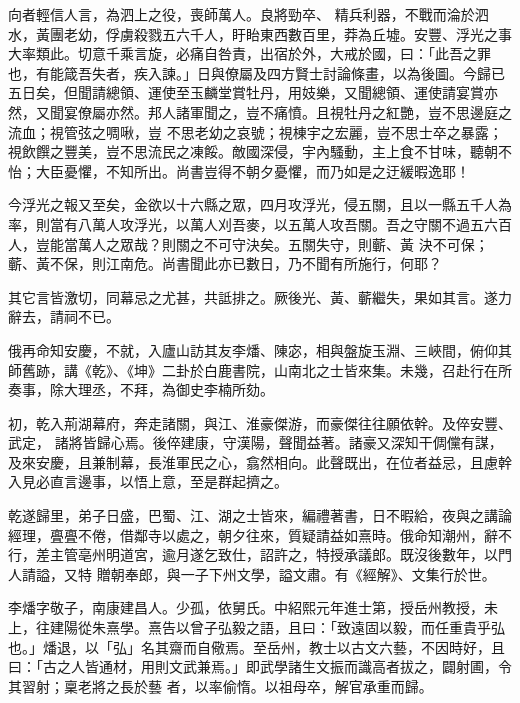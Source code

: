 \begin{pinyinscope}
 向者輕信人言，為泗上之役，喪師萬人。良將勁卒、
 精兵利器，不戰而淪於泗水，黃團老幼，俘虜殺戮五六千人，盱眙東西數百里，莽為丘墟。安豐、浮光之事大率類此。切意千乘言旋，必痛自咎責，出宿於外，大戒於國，曰：「此吾之罪也，有能箴吾失者，疾入諫。」日與僚屬及四方賢士討論條畫，以為後圖。今歸已五日矣，但聞請總領、運使至玉麟堂賞牡丹，用妓樂，又聞總領、運使請宴賞亦然，又聞宴僚屬亦然。邦人諸軍聞之，豈不痛憤。且視牡丹之紅艷，豈不思邊庭之流血；視管弦之啁啾，豈
 不思老幼之哀號；視棟宇之宏麗，豈不思士卒之暴露；視飲饌之豐美，豈不思流民之凍餒。敵國深侵，宇內騷動，主上食不甘味，聽朝不怡；大臣憂懼，不知所出。尚書豈得不朝夕憂懼，而乃如是之迂緩暇逸耶！



 今浮光之報又至矣，金欲以十六縣之眾，四月攻浮光，侵五關，且以一縣五千人為率，則當有八萬人攻浮光，以萬人刈吾麥，以五萬人攻吾關。吾之守關不過五六百人，豈能當萬人之眾哉？則關之不可守決矣。五關失守，則蘄、黃
 決不可保；蘄、黃不保，則江南危。尚書聞此亦已數日，乃不聞有所施行，何耶？



 其它言皆激切，同幕忌之尤甚，共詆排之。厥後光、黃、蘄繼失，果如其言。遂力辭去，請祠不已。



 俄再命知安慶，不就，入廬山訪其友李燔、陳宓，相與盤旋玉淵、三峽間，俯仰其師舊跡，講《乾》、《坤》二卦於白鹿書院，山南北之士皆來集。未幾，召赴行在所奏事，除大理丞，不拜，為御史李楠所劾。



 初，乾入荊湖幕府，奔走諸關，與江、淮豪傑游，而豪傑往往願依幹。及倅安豐、武定，
 諸將皆歸心焉。後倅建康，守漢陽，聲聞益著。諸豪又深知干倜儻有謀，及來安慶，且兼制幕，長淮軍民之心，翕然相向。此聲既出，在位者益忌，且慮幹入見必直言邊事，以悟上意，至是群起擠之。



 乾遂歸里，弟子日盛，巴蜀、江、湖之士皆來，編禮著書，日不暇給，夜與之講論經理，亹亹不倦，借鄰寺以處之，朝夕往來，質疑請益如熹時。俄命知潮州，辭不行，差主管亳州明道宮，逾月遂乞致仕，詔許之，特授承議郎。既沒後數年，以門人請謚，又特
 贈朝奉郎，與一子下州文學，謚文肅。有《經解》、文集行於世。



 李燔字敬子，南康建昌人。少孤，依舅氏。中紹熙元年進士第，授岳州教授，未上，往建陽從朱熹學。熹告以曾子弘毅之語，且曰：「致遠固以毅，而任重貴乎弘也。」燔退，以「弘」名其齋而自儆焉。至岳州，教士以古文六藝，不因時好，且曰：「古之人皆通材，用則文武兼焉。」即武學諸生文振而識高者拔之，闢射圃，令其習射；稟老將之長於藝
 者，以率偷惰。以祖母卒，解官承重而歸。




\end{pinyinscope}
